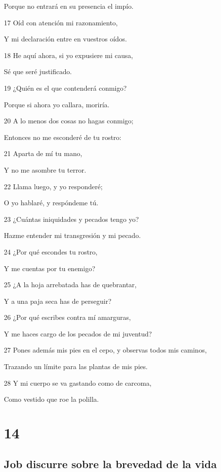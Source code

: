 \par Porque no entrará en su presencia el impío.
\par 17 Oíd con atención mi razonamiento,
\par Y mi declaración entre en vuestros oídos.
\par 18 He aquí ahora, si yo expusiere mi causa,
\par Sé que seré justificado.
\par 19 ¿Quién es el que contenderá conmigo?
\par Porque si ahora yo callara, moriría.
\par 20 A lo menos dos cosas no hagas conmigo;
\par Entonces no me esconderé de tu rostro:
\par 21 Aparta de mí tu mano,
\par Y no me asombre tu terror.
\par 22 Llama luego, y yo responderé;
\par O yo hablaré, y respóndeme tú.
\par 23 ¿Cuántas iniquidades y pecados tengo yo?
\par Hazme entender mi transgresión y mi pecado.
\par 24 ¿Por qué escondes tu rostro,
\par Y me cuentas por tu enemigo?
\par 25 ¿A la hoja arrebatada has de quebrantar,
\par Y a una paja seca has de perseguir?
\par 26 ¿Por qué escribes contra mí amarguras,
\par Y me haces cargo de los pecados de mi juventud?
\par 27 Pones además mis pies en el cepo, y observas todos mis caminos,
\par Trazando un límite para las plantas de mis pies. 
\par 28 Y mi cuerpo se va gastando como de carcoma,
\par Como vestido que roe la polilla. 

\chapter{14}

\section*{Job discurre sobre la brevedad de la vida}

